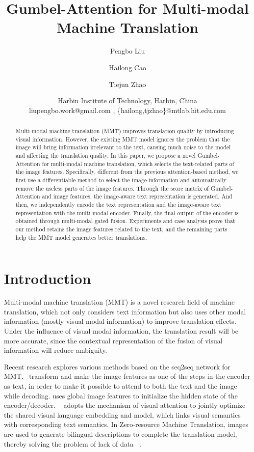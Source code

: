 \documentclass{article}
\title{Gumbel-Attention for Multi-modal Machine Translation}
\author{
}
\author{
Pengbo Liu
\and
Hailong Cao\and
Tiejun Zhao\and
\affiliations
Harbin Institute of Technology, Harbin, China\\
\emails
liupengbo.work@gmail.com ,
\{hailong,tjzhao\}@mtlab.hit.edu.com
}
\begin{document}
\maketitle

\begin{abstract}
Multi-modal machine translation (MMT) improves translation quality by introducing visual information. However, the existing MMT model ignores the problem that the image will bring information irrelevant to the text, causing much noise to the model and affecting the translation quality. In this paper, we propose a novel Gumbel-Attention for multi-modal machine translation, which selects the text-related parts of the image features. Specifically, different from the previous attention-based method, we first use a differentiable method to select the image information and automatically remove the useless parts of the image features. Through the score matrix of Gumbel-Attention and image features, the image-aware text representation is generated. And then, we independently encode the text representation and the image-aware text representation with the multi-modal encoder. Finally, the final output of the encoder is obtained through multi-modal gated fusion.
Experiments and case analysis prove that our method retains the image features related to the text, and the remaining parts help the MMT model generates better translations.

\end{abstract}

\section{Introduction}
Multi-modal machine translation (MMT) is a novel research field of machine translation, which not only considers text information but also uses other modal information (mostly visual modal information) to improve translation effects. Under the influence of visual modal information, the translation result will be more accurate, since the contextual representation of the fusion of visual information will reduce ambiguity. 

Recent research explores various methods based on the seq2seq network for MMT. 
~\cite{DBLP:conf/wmt/HuangLSOD16}transform and make the image features as one of the steps in the encoder as text, in order to make it possible to attend to both the text and the image while decoding.
\cite{DBLP:conf/emnlp/CalixtoL17} uses global image features to initialize the hidden state of the encoder/decoder.
~\cite{DBLP:conf/emnlp/ZhouCLY18} adopts the mechanism of visual attention to jointly optimize the shared visual language embedding and model, which links visual semantics with corresponding text semantics. 
In Zero-resource Machine Translation, images are used to generate bilingual descriptions to complete the translation model, thereby solving the problem of lack of data ~\cite{DBLP:conf/ijcai/ChenJF19}.
\end{document}
